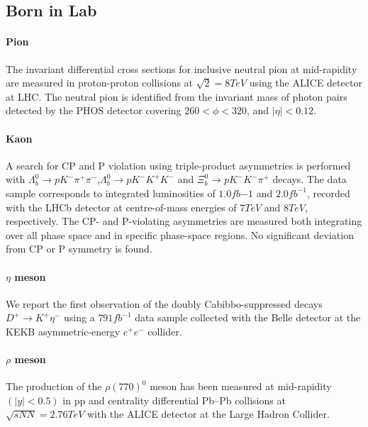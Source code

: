 \documentclass[
10pt, %
a4paper, %
oneside, %
headinclude,footinclude, %
BCOR5mm, %
]{scrartcl}
\begin{document}



\subsection{Born in Lab}

\paragraph{Pion}The invariant differential cross sections for inclusive neutral pion at mid-rapidity are measured in proton-proton collisions at $\sqrt{2} = 8 TeV$ using the ALICE detector at LHC. The neutral pion is identified from the invariant mass of photon pairs detected by the PHOS detector covering $260 < \phi < 320$, and $ |\eta| < 0.12$\cite{Yano:2310803}.

\paragraph{Kaon}A search for CP and P violation using triple-product asymmetries is performed with $\Lambda^{0}_{b}\to pK^{-}\pi^{+}\pi^{-}$,$
\Lambda^{0}_{b}\to pK^{-}K^{+}K^{-}$ and $\Xi^{0}_{b}\to pK^{-}K^{-}\pi^{+}$ decays. The data sample corresponds to integrated luminosities of $1.0fb{-1}$ and $2.0fb^{-1}$, recorded with the LHCb detector at centre-of-mass energies of $7 TeV$ and $8 TeV$, respectively. The CP- and P-violating asymmetries are measured both integrating over all phase space and in specific phase-space regions. No significant deviation from CP or P symmetry is found.\cite{Aaij:2317224}

\paragraph{$\eta$ meson} We report the first observation of the doubly Cabibbo-suppressed decays $D^+\rightarrow K^+\eta^-$ using a $791fb^{-1}$ data sample collected with the Belle detector at the KEKB asymmetric-energy $e^+e^-$ collider. \cite{PhysRevLett.107.221801}

\paragraph{$\rho$ meson}The production of the $\rho(770)^0$ meson has been measured at mid-rapidity $(|y| < 0.5)$ in pp and centrality differential Pb–Pb collisions at $\sqrt{sNN} = 2.76 TeV$ with the ALICE detector at the Large Hadron Collider. \cite{Acharya:2316135}
\end{document}
